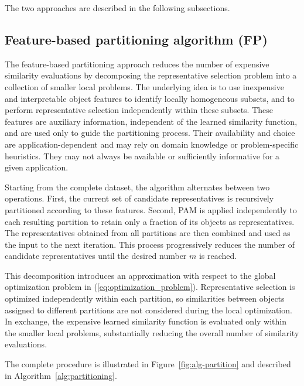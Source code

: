\documentclass{ieeeaccess}
\newcommand{\representativeamount}{m}
\newcommand{\partitioning}{FP\xspace}
\begin{document}
The two approaches are described in the following subsections.

\subsection{Feature-based partitioning algorithm (\partitioning)}
\label{sec:partitioning}

The feature-based partitioning approach reduces the number of expensive similarity evaluations by decomposing the representative selection problem into a collection of smaller local problems. The underlying idea is to use inexpensive and interpretable object features to identify locally homogeneous subsets, and to perform
representative selection independently within these subsets. These features are auxiliary information, independent of the learned similarity function, and are used only to guide the partitioning process. Their availability and choice are application-dependent and may rely on domain knowledge or problem-specific heuristics. They may not always be available or sufficiently informative for a given application.

Starting from the complete dataset, the algorithm alternates between two operations. First, the current set of candidate representatives is recursively partitioned according to these features. Second, PAM is applied independently to each resulting partition to retain only a fraction of its objects as representatives. The representatives obtained from all partitions are then combined and used as the input to the next iteration. This process progressively reduces the number of candidate representatives until the desired number $\representativeamount$ is reached.

This decomposition introduces an approximation with respect to the global optimization problem in (\ref{eq:optimization_problem}). Representative selection is optimized independently within each partition, so similarities between objects assigned to different partitions are not considered during the local optimization. In exchange, the expensive learned similarity function is evaluated only within the smaller local problems, substantially reducing the overall number of similarity evaluations.

The complete procedure is illustrated in Figure~\ref{fig:alg-partition} and described in Algorithm~\ref{alg:partitioning}. 
\end{document}
